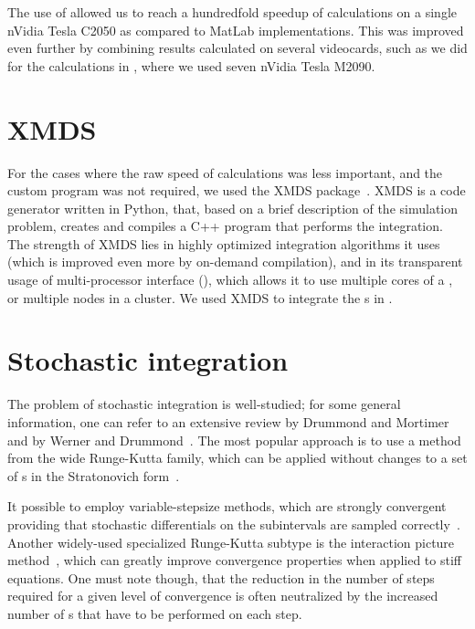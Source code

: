 The use of  allowed us to reach a hundredfold speedup of calculations on a single nVidia Tesla C2050 as compared to MatLab implementations.
This was improved even further by combining results calculated on several videocards, such as we did for the calculations in , where we used seven nVidia Tesla M2090.


\section{XMDS}

For the cases where the raw speed of calculations was less important, and the custom  program was not required, we used the XMDS package~\cite{Collecutt2001,Dennis2013}.
XMDS is a code generator written in Python, that, based on a brief  description of the simulation problem, creates and compiles a C++ program that performs the integration.
The strength of XMDS lies in highly optimized integration algorithms it uses (which is improved even more by on-demand compilation), and in its transparent usage of multi-processor interface (), which allows it to use multiple cores of a , or multiple nodes in a cluster.
We used XMDS to integrate the s in .


\section{Stochastic integration}

The problem of stochastic integration is well-studied; for some general information, one can refer to an extensive review by Drummond and Mortimer~\cite{Drummond1990} and by Werner and Drummond~\cite{Werner1997}.
The most popular approach is to use a method from the wide Runge-Kutta family, which can be applied without changes to a set of s in the Stratonovich form~\cite{Wilkie2004,Wilkie2005}.

It possible to employ variable-stepsize methods, which are strongly convergent providing that stochastic differentials on the subintervals are sampled correctly~\cite{Wilkie2005}.
Another widely-used specialized Runge-Kutta subtype is the  interaction picture method~\cite{CaradocDavies2000}, which can greatly improve convergence properties when applied to stiff equations.
One must note though, that the reduction in the number of steps required for a given level of convergence is often neutralized by the increased number of s that have to be performed on each step.

